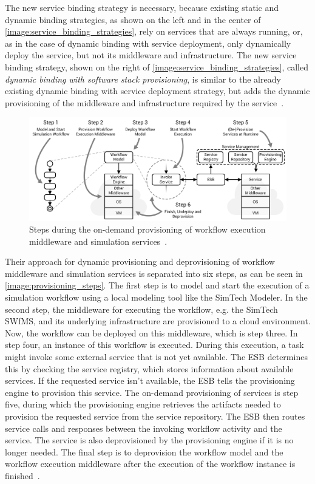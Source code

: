 The new service binding strategy is necessary, because existing static and dynamic binding strategies, as shown on the left and in the center of \autoref{image:service_binding_strategies}, rely on services that are always running, or, as in the case of dynamic binding with service deployment, only dynamically deploy the service, but not its middleware and infrastructure.
The new service binding strategy, shown on the right of \autoref{image:service_binding_strategies}, called \textit{dynamic binding with software stack provisioning}, is similar to the already existing dynamic binding with service deployment strategy, but adds the dynamic provisioning of the middleware and infrastructure required by the service~\autocite{provisioning:ondemand}.

\begin{figure}[!htbp]
	\centering
	\includegraphics[resolution=600]{previous/assets/provisioning_steps}
	\caption{Steps during the on-demand provisioning of workflow execution middleware and simulation services~\autocite[based on][]{provisioning:ondemand}.}
	\label{image:provisioning_steps}
\end{figure}

Their approach for dynamic provisioning and deprovisioning of workflow middleware and simulation services is separated into six steps, as can be seen in \autoref{image:provisioning_steps}.
The first step is to model and start the execution of a simulation workflow using a local modeling tool like the SimTech Modeler.
In the second step, the middleware for executing the workflow, e.g. the SimTech SWfMS, and its underlying infrastructure are provisioned to a cloud environment.
Now, the workflow can be deployed on this middleware, which is step three.
In step four, an instance of this workflow is executed.
During this execution, a task might invoke some external service that is not yet available.
The ESB determines this by checking the service registry, which stores information about available services.
If the requested service isn't available, the ESB tells the provisioning engine to provision this service.
The on-demand provisioning of services is step five, during which the provisioning engine retrieves the artifacts needed to provision the requested service from the service repository.
The ESB then routes service calls and responses between the invoking workflow activity and the service.
The service is also deprovisioned by the provisioning engine if it is no longer needed.
The final step is to deprovision the workflow model and the workflow execution middleware after the execution of the workflow instance is finished~\autocite{provisioning:ondemand}.

